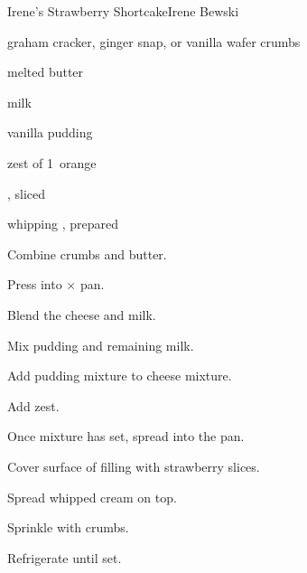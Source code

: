 \begin{recipe}{Irene's Strawberry Shortcake}{Irene Bewski}{}

\begin{ingredients}
\item \C{2\half} graham cracker, ginger snap, or vanilla wafer crumbs
\item \C{\half} melted butter
\item {} 
\item \C{1\threequarter} milk
\item \oz{3\quarter} vanilla pudding
\item zest of 1~orange
\item {} , sliced
\item whipping , prepared
\end{ingredients}

\begin{directions}
\item Combine crumbs and butter.
\item Press into $\times$ pan.
\item Blend the cheese and \C{\half} milk.
\item Mix pudding and remaining milk.
\item Add pudding mixture to cheese mixture.
\item Add zest.
\item Once mixture has set, spread into the pan.
\item Cover surface of filling with strawberry slices.
\item Spread whipped cream on top.
\item Sprinkle with crumbs.
\item Refrigerate until set.
\end{directions}

\end{recipe}
